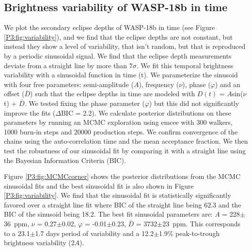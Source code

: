 \subsection{Brightness variability of WASP-18b in time}

We plot the secondary eclipse depths of WASP-18b in time (see Figure \ref{P3:fig:variability}), and we find that the eclipse depths are not constant, but instead they show a level of variability, that isn't random, but that is reproduced by a periodic sinusoidal signal. We find that the eclipse depth measurements deviate from a straight line by more than 7$\sigma$. We fit this temporal brightness variability with a sinusoidal function in time (t).
We parameterize the sinusoid with four free parameters: semi-amplitude ($A$), frequency ($\nu$), phase ($\varphi$) and an offset ($\bar{D}$) such that the eclipse depths in time are modeled with $D(t)$ = $A$sin($\nu$t) + $\bar{D}$. We tested fixing the phase parameter ($\varphi$) but this did not significantly improve the fits ($\Delta$BIC = 2.2).
We calculate posterior distributions on these parameters by running an MCMC exploration using emcee \citep{Foreman-Mackey2013} with 300 walkers, 1000 burn-in steps and 20000 production steps. We confirm convergence of the chains using the auto-correlation time and the mean acceptance fraction. We then test the robustness of our sinusoidal fit by comparing it with a straight line using the Bayesian Information Criteria (BIC).

Figure \ref{P3:fig:MCMCcorner} shows the posterior distributions from the MCMC sinusoidal fits and the best sinusoidal fit is also shown in Figure \ref{P3:fig:variability}. We find that the sinusoidal fit is statistically significantly favored over a straight line fit where BIC of the straight line being 62.3 and the BIC of the sinusoid being 18.2.
The best fit sinusoidal parameters are: $A$ = 228$\pm$36~ppm, $\nu$ = 0.27$\pm$0.02, $\varphi$ = -0.01$\pm$0.23, $\bar{D}$ = 3732$\pm$23~ppm. This corresponds to a 23.1$\pm$1.7 days period of variability and a 12.2$\pm$1.9\% peak-to-trough brightness variability (2$A$).


